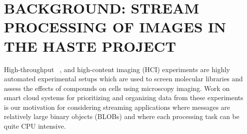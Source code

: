 \documentclass[conference]{IEEEtran}
\begin{document}
\section{BACKGROUND: STREAM PROCESSING OF IMAGES IN THE HASTE PROJECT}\label{background}


High-throughput ~\cite{wollmanHighThroughputMicroscopy2007}, and high-content imaging (HCI) experiments are highly automated experimental setups which are used to screen molecular libraries and assess the effects of compounds on cells using microscopy imaging. Work on smart cloud systems for prioritizing and organizing data from these experiments is our motivation for considering streaming applications where messages are relatively large binary objects (BLOBs) and where each processing task can be quite CPU intensive.

\end{document}
